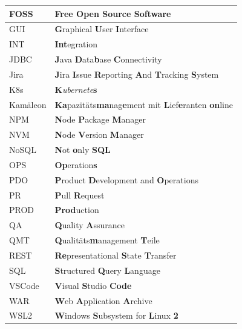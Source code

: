\documentclass[11pt, a4paper, oneside]{scrartcl}
\begin{document}
\begin{longtable}{|l|l|}
            \hline
            FOSS & \textbf{F}ree \textbf{O}pen \textbf{S}ource \textbf{S}oftware\\
            \hline
            GUI & \textbf{G}raphical \textbf{U}ser \textbf{I}nterface\\
            \hline
            INT & \textbf{Int}egration\\
            \hline
            JDBC & \textbf{J}ava \textbf{D}ata\textbf{b}ase \textbf{C}onnectivity\\
            \hline
            Jira & \textbf{J}ira \textbf{I}ssue \textbf{R}eporting \textbf{A}nd \textbf{T}racking
                \textbf{S}ystem\\
            \hline
            K8s & \textbf{K}\textit{ubernete}\textbf{s}\\
            \hline
            Kamäleon & \textbf{Ka}pazitäts\textbf{ma}nag\textbf{e}ment mit
                \textbf{L}ief\textbf{e}ranten \textbf{on}line\\
            \hline
            NPM & \textbf{N}ode \textbf{P}ackage \textbf{M}anager\\
            \hline
            NVM & \textbf{N}ode \textbf{V}ersion \textbf{M}anager\\
            \hline
            NoSQL & \textbf{N}ot \textbf{o}nly \textbf{SQL}\\
            \hline
            OPS & \textbf{Op}eration\textbf{s}\\
            \hline
            PDO & \textbf{P}roduct \textbf{D}evelopment and \textbf{O}perations\\
            \hline
            PR & \textbf{P}ull \textbf{R}equest\\
            \hline
            PROD & \textbf{Prod}uction\\
            \hline
            QA & \textbf{Q}uality \textbf{A}ssurance\\
            \hline
            QMT & \textbf{Q}ualitäts\textbf{m}anagement \textbf{T}eile\\
            \hline
            REST & \textbf{Re}presentational \textbf{S}tate \textbf{T}ransfer\\
            \hline
            SQL & \textbf{S}tructured \textbf{Q}uery \textbf{L}anguage\\
            \hline
            VSCode & \textbf{V}isual \textbf{S}tudio \textbf{Code}\\
            \hline
            WAR & \textbf{W}eb \textbf{A}pplication \textbf{A}rchive\\
            \hline
            WSL2 & \textbf{W}indows \textbf{S}ubsystem for \textbf{L}inux \textbf{2}\\
            \hline
        \end{longtable}
\end{document}
